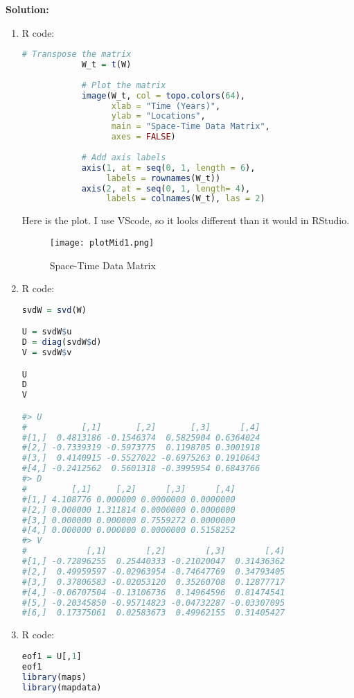 \documentclass[12pt]{article}
\newenvironment{solution}{
    \textbf{Solution:}
    
}{
    
    \vspace{2em}
}
\begin{document}
\begin{solution}
    \begin{enumerate}[label=\alph*)]
        \item R code:
        \begin{lstlisting}[language=R]
            # Transpose the matrix
            W_t = t(W)
            
            # Plot the matrix
            image(W_t, col = topo.colors(64), 
                  xlab = "Time (Years)", 
                  ylab = "Locations", 
                  main = "Space-Time Data Matrix",
                  axes = FALSE)
            
            # Add axis labels
            axis(1, at = seq(0, 1, length = 6), 
                 labels = rownames(W_t))
            axis(2, at = seq(0, 1, length= 4), 
                 labels = colnames(W_t), las = 2)
        \end{lstlisting}
        Here is the plot. I use VScode, so it looks different than it would in RStudio.
        \begin{figure}[H]
            \centering
            \texttt{[image: plotMid1.png]}
            \caption{Space-Time Data Matrix}
        \end{figure}

        \newpage

        \item R code:
        \begin{lstlisting}[language=R]
svdW = svd(W)

U = svdW$u
D = diag(svdW$d)
V = svdW$v

U
D
V

#> U
#           [,1]       [,2]       [,3]      [,4]
#[1,]  0.4813186 -0.1546374  0.5825904 0.6364024
#[2,] -0.7339319 -0.5973775  0.1198705 0.3001918
#[3,]  0.4140915 -0.5527022 -0.6975263 0.1910643
#[4,] -0.2412562  0.5601318 -0.3995954 0.6843766
#> D
#         [,1]     [,2]      [,3]      [,4]
#[1,] 4.108776 0.000000 0.0000000 0.0000000
#[2,] 0.000000 1.311814 0.0000000 0.0000000
#[3,] 0.000000 0.000000 0.7559272 0.0000000
#[4,] 0.000000 0.000000 0.0000000 0.5158252
#> V
#            [,1]        [,2]        [,3]        [,4]
#[1,] -0.72896255  0.25440333 -0.21020047  0.31436362
#[2,]  0.49959597 -0.02963954 -0.74647769  0.34793405
#[3,]  0.37806583 -0.02053120  0.35260708  0.12877717
#[4,] -0.06707504 -0.13106736  0.14964596  0.81474541
#[5,] -0.20345850 -0.95714823 -0.04732287 -0.03307095
#[6,]  0.17375061  0.02583673  0.49962155  0.31405427
        \end{lstlisting}
        \item R code:
        \begin{lstlisting}[language=R]
eof1 = U[,1]
eof1
library(maps)
library(mapdata)


\end{lstlisting}
\end{enumerate}
\end{solution}
\end{document}
